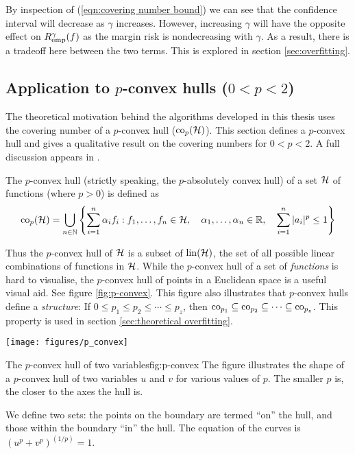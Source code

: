 By inspection of (\ref{eqn:covering number bound}) we can see that the
confidence interval will decrease as $\gamma$ increases.  However,
increasing $\gamma$ will have the opposite effect on
$R_{\mathrm{emp}}^{\gamma}(f)$ as the margin risk is nondecreasing with
$\gamma$.  As a result, there is a tradeoff here between the two
terms.  This is explored in section \ref{sec:overfitting}.

\subsection{Application to $p$-convex hulls ($0 < p < 2$)}
\label{sec:p-convex}

The theoretical motivation behind the algorithms developed in this
thesis uses the covering number of a $p$-convex hull ($\mathrm{co}_p(\mathcal{H})$).
This section defines a $p$-convex hull and gives a qualitative result
on the covering numbers for $0 < p < 2$.  A full discussion appears in
\cite{Williamson99}.

\begin{definition}
\label{def:p-convex hull}
The $p$-convex hull (strictly speaking, the $p$-absolutely convex hull) of
a set $\mathcal{H}$ of functions (where $p>0$) is defined as
%
\begin{equation}
\mathrm{co}_p (\mathcal{H}) =
 \bigcup _{n \in \mathbb{N}}
\left\{
 \sum_{i=1}^{n}
 \alpha _i
f_i : f_1, \ldots, f_n \in \mathcal{H}, \quad
 \alpha _1, \ldots, \alpha _n \in \mathbb{R}, \quad
 \sum_{i=1}^{n} | a_i |^p \leq 1
\right\}
\end{equation}
\end{definition}

Thus the $p$-convex hull of $\mathcal{H}$ is a subset of $\mathrm{lin}(\mathcal{H})$, the
set of all possible linear combinations of functions in $\mathcal{H}$.
While the $p$-convex hull of a set of \emph{functions} is hard to
visualise, the $p$-convex hull of points in a Euclidean space is a
useful visual aid.  See figure \ref{fig:p-convex}.  This figure also
illustrates that $p$-convex hulls define a \emph{structure}:  If $0
\leq p_1 \leq p_2 \leq \cdots \leq p_z$, then $\mathrm{co}_{p_1} \subseteq
\mathrm{co}_{p_2} \subseteq \cdots \subseteq \mathrm{co}_{p_z}$.  This property is
used in section 
\ref{sec:theoretical overfitting}.

\begin{linefigure}
\begin{center}
\texttt{[image: figures/p\_convex]}
\end{center}
\begin{capt}{The $p$-convex hull of two variables}{fig:p-convex}
The figure illustrates the shape of a $p$-convex hull of two variables $u$
and $v$ for various values of $p$.  The smaller $p$ is, the closer to
the axes the hull is.  

We define two sets: the points on the boundary are termed ``on'' the
hull, and those within the boundary ``in'' the hull.  The equation of
the curves is $\left( u^p + v^p \right) ^{(1/p)} = 1$.
\end{capt}
\end{linefigure}

